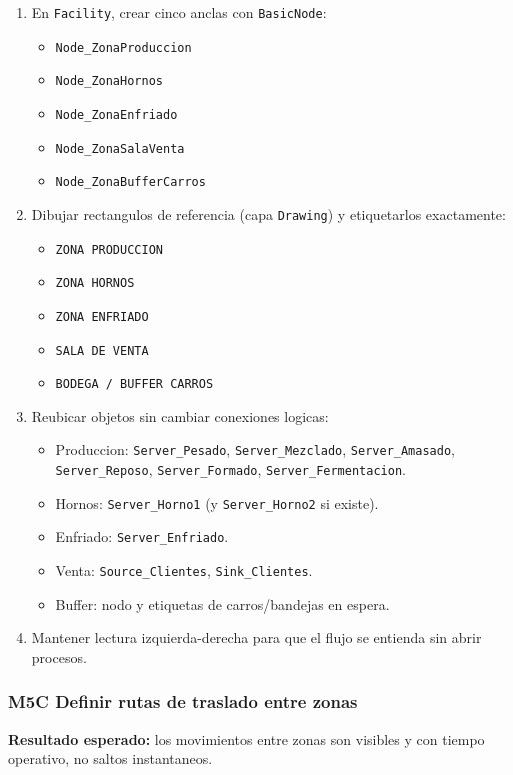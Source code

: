 \documentclass[11pt]{article}
\newcommand{\simio}[1]{\texttt{#1}}
\begin{document}
\begin{enumerate}
  \item En \simio{Facility}, crear cinco anclas con \simio{BasicNode}:
  \begin{itemize}
    \item \simio{Node\_ZonaProduccion}
    \item \simio{Node\_ZonaHornos}
    \item \simio{Node\_ZonaEnfriado}
    \item \simio{Node\_ZonaSalaVenta}
    \item \simio{Node\_ZonaBufferCarros}
  \end{itemize}
  \item Dibujar rectangulos de referencia (capa \simio{Drawing}) y etiquetarlos exactamente:
  \begin{itemize}
    \item \simio{ZONA PRODUCCION}
    \item \simio{ZONA HORNOS}
    \item \simio{ZONA ENFRIADO}
    \item \simio{SALA DE VENTA}
    \item \simio{BODEGA / BUFFER CARROS}
  \end{itemize}
  \item Reubicar objetos sin cambiar conexiones logicas:
  \begin{itemize}
    \item Produccion: \simio{Server\_Pesado}, \simio{Server\_Mezclado}, \simio{Server\_Amasado}, \simio{Server\_Reposo}, \simio{Server\_Formado}, \simio{Server\_Fermentacion}.
    \item Hornos: \simio{Server\_Horno1} (y \simio{Server\_Horno2} si existe).
    \item Enfriado: \simio{Server\_Enfriado}.
    \item Venta: \simio{Source\_Clientes}, \simio{Sink\_Clientes}.
    \item Buffer: nodo y etiquetas de carros/bandejas en espera.
  \end{itemize}
  \item Mantener lectura izquierda-derecha para que el flujo se entienda sin abrir procesos.
\end{enumerate}

\subsubsection{M5C Definir rutas de traslado entre zonas}
\textbf{Resultado esperado:} los movimientos entre zonas son visibles y con tiempo operativo, no saltos instantaneos.
\end{document}
